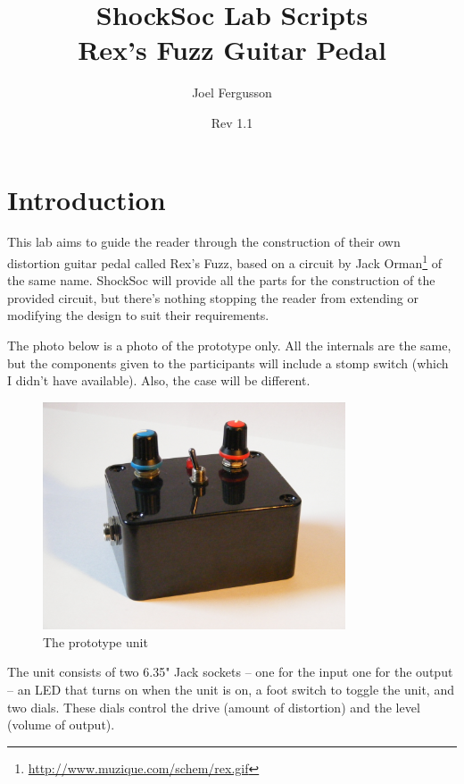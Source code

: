 \documentclass[a4paper]{article}
\title{ShockSoc Lab Scripts\\ \huge{Rex's Fuzz Guitar Pedal}}
\author{Joel Fergusson}
\date{Rev 1.1}
\begin{document}
\maketitle

\newcommand{\ohm}{$\Omega$ }
\newcommand{\micro}{$\mu$ }

\section{Introduction}

	This lab aims to guide the reader through the construction of their 
	own distortion guitar pedal called Rex's Fuzz, based on a circuit by 
	Jack Orman\footnote{\url{http://www.muzique.com/schem/rex.gif}} of 
	the same name. ShockSoc will provide all the parts for 
	the construction of the provided circuit, but there's nothing 
	stopping the reader from extending or modifying the design to suit 
	their requirements. 
	
	The photo below is a photo of the prototype only. All the internals 
	are the same, but the components given to the participants will 
	include a stomp switch (which I didn't have available). Also, 
	the case will be different. 
	
	\begin{figure}[ht]
		\centering
		\includegraphics[width=0.8\textwidth]{DSCF7302.JPG}
		\caption{The prototype unit}
		\label{fig:schematic}
	\end{figure}
	
	The unit consists of two 6.35" Jack sockets -- one for the input one 
	for the output -- an LED that turns on when the unit is on, a foot 
	switch to toggle the unit, and two dials. These dials control the 
	drive (amount of distortion) and the level (volume of output).
\end{document}
